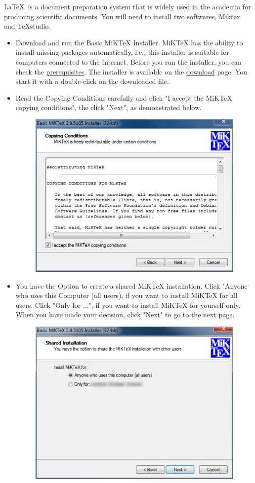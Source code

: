 \documentclass[10pt]{article} %
\begin{document}
\LaTeX~is a document preparation system that is widely used in the academia for producing scientific documents.
You will need to install two softwares,  Miktex and TeXstudio. \\
\begin{itemize}
  \item Download and run the Basic MiKTeX Installer.
  MiKTeX has the ability to install missing packages automatically, i.e., this installer is suitable for computers connected to the Internet.
  Before you run the installer, you can check the \href{https://miktex.org/kb/prerequisites-2-9}{prerequisites}.
  The installer is available on the \href{https://miktex.org/download}{download} page.
  You start it with a double-click on the downloaded file.
  \item Read the Copying Conditions carefully and click "I accept the MiKTeX copying conditions", the click "Next", as demonstrated below.

  \begin{figure}[!ht]
    \centering
    \includegraphics[width=0.7\linewidth]{figs/basic-miktex-license-2-9}
    \caption{}
    \label{fig:basic-miktex-license-2-9}
  \end{figure}
  \item You have the Option to create a shared MiKTeX installation.
  Click "Anyone who uses this Computer (all users), if you want to install MiKTeX for all users.
  Click "Only for ...", if you want to install MiKTeX for yourself only.
  When you have made your decision, click "Next" to go to the next page.

  \begin{figure}[h]
    \centering
    \includegraphics[width=0.7\linewidth]{figs/basic-miktex-shared-2-9}
    \caption{}
    \label{fig:basic-miktex-shared-2-9}
  \end{figure}


\end{itemize}
\end{document}
